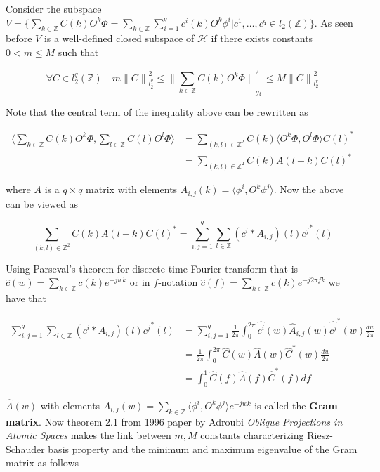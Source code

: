 \documentclass[a4paper, 11pt]{article}
\begin{document}
Consider the subspace $\displaystyle V= \{  \sum_{k \in \mathbb{Z}} C(k) O^k\Phi = \sum_{k \in \mathbb{Z}} \sum_{i=1}^q 
c^i(k) O^k\phi^i  | c^1, \ldots, c^q \in l_2(\mathbb{Z})\}$. As seen before $V$ is a well-defined closed subspace of 
$\mathcal{H}$ if there exists constants $0 < m \leq M$ such that

\begin{equation}
  \forall C \in l_2^q(\mathbb{Z}) \quad  m {\|C\|}_{l_2^q}^2 \leq {\| \sum_{k \in \mathbb{Z}} C(k) O^k\Phi
  \|}_{\mathcal{H}}^2 \leq M {\|C\|}_{l_2^r}^2
\end{equation}

Note that the central term of the inequality above can be rewritten as

\begin{align*}
  \langle \sum_{k \in \mathbb{Z}} C(k) O^k\Phi, \sum_{l \in \mathbb{Z}} C(l) O^l\Phi \rangle & = \sum_{(k,l) \in 
  \mathbb{Z}^2} C(k) \langle O^k\Phi, O^l\Phi \rangle C(l)^* \\
  &=  \sum_{(k,l) \in \mathbb{Z}^2} C(k) A(l-k) C(l)^*
\end{align*}

where $A$ is a $q\times q$ matrix with elements $A_{i,j}(k) = \langle \phi^i, O^k\phi^j \rangle$. Now the above can be 
viewed as

\begin{equation*}
  \sum_{(k,l) \in \mathbb{Z}^2} C(k) A(l-k) C(l)^* = \sum_{i,j=1}^q \sum_{l \in \mathbb{Z}} (c^i * A_{i,j}) (l) {c^j}^* 
  (l)
\end{equation*}

Using Parseval's theorem for discrete time Fourier transform that is $\hat{c}(w) = \sum_{k \in \mathbb{Z}} c(k) 
e^{-jwk}$ or in $f$-notation $\hat{c}(f) = \sum_{k \in \mathbb{Z}} c(k) e^{-j2\pi fk}$ we have that

\begin{align*}
  \sum_{i,j=1}^q \sum_{l \in \mathbb{Z}} (c^i * A_{i,j}) (l) {c^j}^* (l) &= \sum_{i,j=1}^q \frac{1}{2\pi} 
  \int_{0}^{2\pi} \hat{c^i}(w) \hat{A}_{i,j}(w) \hat{c^j}^*(w) \frac{dw}{2\pi} \\
  &= \frac{1}{2\pi} \int_{0}^{2\pi} \hat{C}(w) \hat{A}(w) \hat{C}^*(w) \frac{dw}{2\pi} \\
  &= \int_{0}^{1} \hat{C}(f) \hat{A}(f) \hat{C}^*(f) df
\end{align*}

$\hat{A}(w)$ with elements $A_{i,j}(w) = \sum_{k \in \mathbb{Z}} \langle \phi^i, O^k \phi^j \rangle e^{-jwk}$ is called 
the \textbf{Gram matrix}. Now theorem 2.1 from 1996 paper by Adroubi \emph{Oblique Projections in Atomic Spaces} makes 
the link between $m,M$ constants characterizing Riesz-Schauder basis property and the minimum and maximum eigenvalue of 
the Gram matrix as follows
\end{document}

